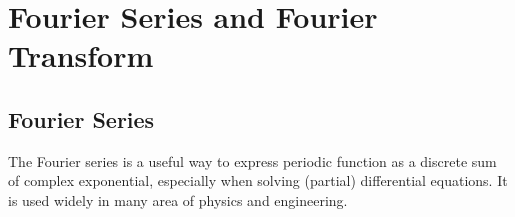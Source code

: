 \documentclass[11pt]{article}
\begin{document}


  


\section{Fourier Series and Fourier Transform}
\subsection{Fourier Series}
The Fourier series is a useful way to express periodic function as a discrete sum of complex exponential, especially when solving (partial) differential equations. It is used widely in many area of physics and engineering.
\end{document}
